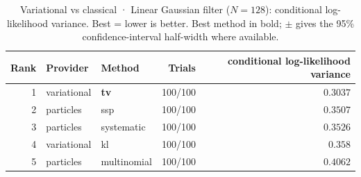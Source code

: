 \begin{table}[!htbp]
\centering
\small
\caption{Variational vs classical · Linear Gaussian filter ($N=128$): conditional log-likelihood variance. Best = lower is better. Best method in bold; $\pm$ gives the 95\% confidence-interval half-width where available.}
\label{tab:variational-vs-classical-linear-gaussian-filter-conditional-loglik-variance}
\begin{tabular}{rllrr}
\toprule
Rank & Provider & Method & Trials & conditional log-likelihood variance \\
\midrule
1 & variational & \textbf{tv} & 100/100 & $\mathbf{0.3037}$ \\
2 & particles & ssp & 100/100 & $0.3507$ \\
3 & particles & systematic & 100/100 & $0.3526$ \\
4 & variational & kl & 100/100 & $0.358$ \\
5 & particles & multinomial & 100/100 & $0.4062$ \\
\bottomrule
\end{tabular}
\end{table}
